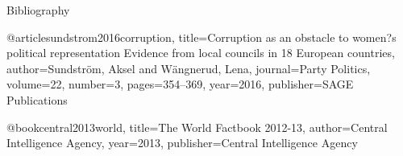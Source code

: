 Bibliography

@article{sundstrom2016corruption,
  title={Corruption as an obstacle to women?s political representation Evidence from local councils in 18 European countries},
  author={Sundstr{\"o}m, Aksel and W{\"a}ngnerud, Lena},
  journal={Party Politics},
  volume={22},
  number={3},
  pages={354--369},
  year={2016},
  publisher={SAGE Publications}
}

@book{central2013world,
  title={The World Factbook 2012-13},
  author={Central Intelligence Agency},
  year={2013},
  publisher={Central Intelligence Agency}
}